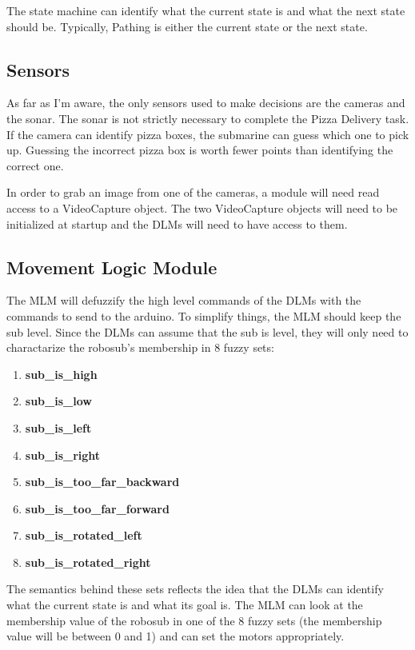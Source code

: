 \documentclass[11pt]{scrartcl}
\begin{document}
  The state machine can identify what the current state is and what the next state should be. Typically, Pathing is either the current state or the next state.

  \subsection{Sensors}
    As far as I'm aware, the only sensors used to make decisions are the cameras and the sonar. The sonar is not strictly necessary to complete the Pizza Delivery task. If the camera can identify pizza boxes, the submarine can guess which one to pick up. Guessing the incorrect pizza box is worth fewer points than identifying the correct one.

    In order to grab an image from one of the cameras, a module will need read access to a VideoCapture object. The two VideoCapture objects will need to be initialized at startup and the DLMs will need to have access to them.

  \subsection{Movement Logic Module}
    The MLM will defuzzify the high level commands of the DLMs with the commands to send to the arduino. To simplify things, the MLM should keep the sub level. Since the DLMs can assume that the sub is level, they will only need to charactarize the robosub's membership in 8 fuzzy sets:

    \begin{enumerate}
      \item {\bf sub\_is\_high}
      \item {\bf sub\_is\_low}
      \item {\bf sub\_is\_left}
      \item {\bf sub\_is\_right}
      \item {\bf sub\_is\_too\_far\_backward}
      \item {\bf sub\_is\_too\_far\_forward}
      \item {\bf sub\_is\_rotated\_left}
      \item {\bf sub\_is\_rotated\_right}
    \end{enumerate}

    The semantics behind these sets reflects the idea that the DLMs can identify what the current state is and what its goal is. The MLM can look at the membership value of the robosub in one of the 8 fuzzy sets (the membership value will be between 0 and 1) and can set the motors appropriately.
\end{document}
